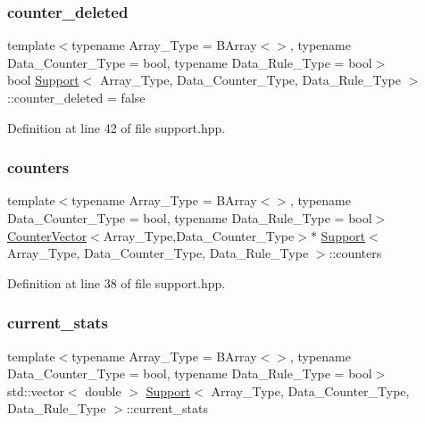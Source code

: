 \subsubsection{\texorpdfstring{counter\+\_\+deleted}{counter\_deleted}}
{\footnotesize\ttfamily template$<$typename Array\+\_\+\+Type = B\+Array$<$$>$, typename Data\+\_\+\+Counter\+\_\+\+Type = bool, typename Data\+\_\+\+Rule\+\_\+\+Type = bool$>$ \\
bool \hyperlink{class_support}{Support}$<$ Array\+\_\+\+Type, Data\+\_\+\+Counter\+\_\+\+Type, Data\+\_\+\+Rule\+\_\+\+Type $>$\+::counter\+\_\+deleted = false}



Definition at line 42 of file support.\+hpp.

\mbox{\label{class_support_af56e20c484c8f10a9cce504aaa6b0b1a}} 
\subsubsection{\texorpdfstring{counters}{counters}}
{\footnotesize\ttfamily template$<$typename Array\+\_\+\+Type = B\+Array$<$$>$, typename Data\+\_\+\+Counter\+\_\+\+Type = bool, typename Data\+\_\+\+Rule\+\_\+\+Type = bool$>$ \\
\hyperlink{class_counter_vector}{Counter\+Vector}$<$Array\+\_\+\+Type,Data\+\_\+\+Counter\+\_\+\+Type$>$$\ast$ \hyperlink{class_support}{Support}$<$ Array\+\_\+\+Type, Data\+\_\+\+Counter\+\_\+\+Type, Data\+\_\+\+Rule\+\_\+\+Type $>$\+::counters}



Definition at line 38 of file support.\+hpp.

\mbox{\label{class_support_aec5901ad006e5ebe29c7605e7bcc702c}} 
\subsubsection{\texorpdfstring{current\+\_\+stats}{current\_stats}}
{\footnotesize\ttfamily template$<$typename Array\+\_\+\+Type = B\+Array$<$$>$, typename Data\+\_\+\+Counter\+\_\+\+Type = bool, typename Data\+\_\+\+Rule\+\_\+\+Type = bool$>$ \\
std\+::vector$<$ double $>$ \hyperlink{class_support}{Support}$<$ Array\+\_\+\+Type, Data\+\_\+\+Counter\+\_\+\+Type, Data\+\_\+\+Rule\+\_\+\+Type $>$\+::current\+\_\+stats}



